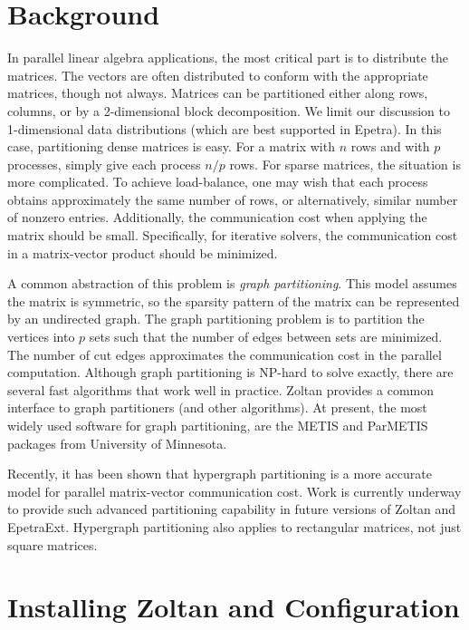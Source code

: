 \section{Background}
In parallel linear algebra applications, the most critical part is to 
distribute the matrices. The vectors are often distributed to conform
with the appropriate matrices, though not always. Matrices can
be partitioned either along rows, columns, or by a 2-dimensional
block decomposition. We limit our discussion to 1-dimensional data
distributions (which are best supported in Epetra). In this case, 
partitioning dense matrices is easy.
For a matrix with $n$ rows and with $p$ processes, simply give
each process $n/p$  rows. For sparse matrices, the situation
is more complicated. To achieve load-balance, one may wish 
that each process obtains approximately the same number of rows,
or alternatively, similar number of nonzero entries. 
Additionally, the communication cost when applying the matrix
should be small. Specifically, for iterative solvers, the
communication cost in a matrix-vector product should be minimized.

A common abstraction of this problem is \emph{graph partitioning}.
This model assumes the matrix is symmetric, so the sparsity 
pattern of the matrix can be represented by an undirected graph.
The graph partitioning problem is to partition the
vertices into $p$ sets such that the number of edges between
sets are minimized. The number of cut edges approximates the
communication cost in the parallel computation. Although 
graph partitioning is NP-hard to solve exactly, there are
several fast algorithms that work well in practice. Zoltan
provides a common interface to graph partitioners (and other algorithms).
At present, the most widely used software for graph partitioning,
are the METIS and ParMETIS \cite{Metis,KarypisK99} packages from University 
of Minnesota.

Recently, it has been shown \cite{CatAyk99} that hypergraph partitioning 
is a more accurate model for parallel matrix-vector communication cost.
Work is currently underway to provide such advanced partitioning capability
in future versions of Zoltan and EpetraExt. Hypergraph partitioning
also applies to rectangular matrices, not just square matrices.

\section{Installing Zoltan and Configuration}

